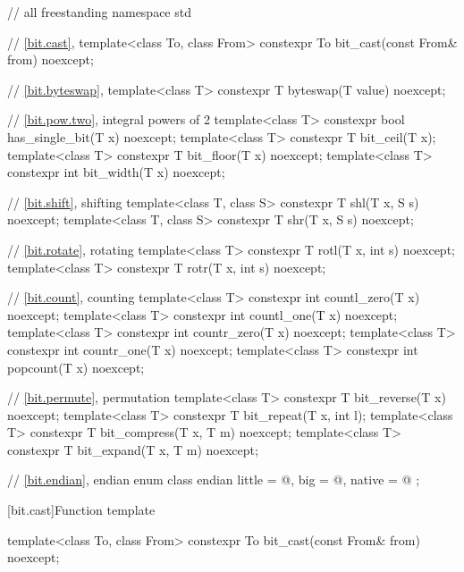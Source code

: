 \begin{codeblock}
// all freestanding
namespace std {
  // \ref{bit.cast}, 
  template<class To, class From>
    constexpr To bit_cast(const From& from) noexcept;

  // \ref{bit.byteswap}, 
  template<class T>
    constexpr T byteswap(T value) noexcept;

  // \ref{bit.pow.two}, integral powers of 2
  template<class T>
    constexpr bool has_single_bit(T x) noexcept;
  template<class T>
    constexpr T bit_ceil(T x);
  template<class T>
    constexpr T bit_floor(T x) noexcept;
  template<class T>
    constexpr int bit_width(T x) noexcept;

  // \ref{bit.shift}, shifting
  template<class T, class S>
    constexpr T shl(T x, S s) noexcept;
  template<class T, class S>
    constexpr T shr(T x, S s) noexcept;

  // \ref{bit.rotate}, rotating
  template<class T>
    constexpr T rotl(T x, int s) noexcept;
  template<class T>
    constexpr T rotr(T x, int s) noexcept;

  // \ref{bit.count}, counting
  template<class T>
    constexpr int countl_zero(T x) noexcept;
  template<class T>
    constexpr int countl_one(T x) noexcept;
  template<class T>
    constexpr int countr_zero(T x) noexcept;
  template<class T>
    constexpr int countr_one(T x) noexcept;
  template<class T>
    constexpr int popcount(T x) noexcept;

  // \ref{bit.permute}, permutation
  template<class T>
    constexpr T bit_reverse(T x) noexcept;
  template<class T>
    constexpr T bit_repeat(T x, int l);
  template<class T>
    constexpr T bit_compress(T x, T m) noexcept;
  template<class T>
    constexpr T bit_expand(T x, T m) noexcept;

  // \ref{bit.endian}, endian
  enum class endian {
    little = @\seebelow@,
    big    = @\seebelow@,
    native = @\seebelow@
  };
}
\end{codeblock}

[bit.cast]{Function template }

%
\begin{itemdecl}
template<class To, class From>
  constexpr To bit_cast(const From& from) noexcept;
\end{itemdecl}

